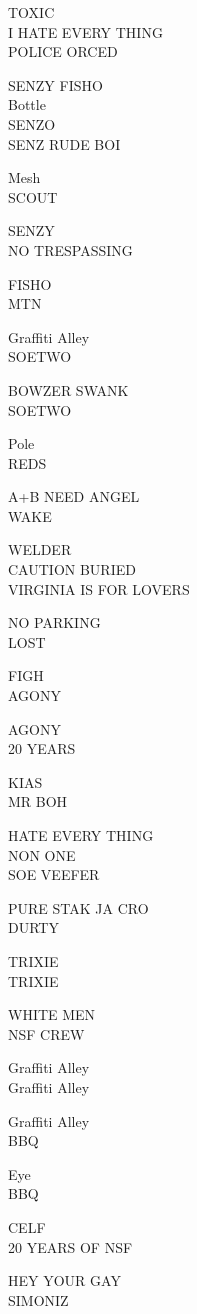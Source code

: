 \documentclass[10pt,letterpaper]{article}
\begin{document}
TOXIC\\
I HATE EVERY THING\\
POLICE ORCED

SENZY FISHO\\
Bottle\\
SENZO\\
SENZ RUDE BOI

Mesh\\
SCOUT

SENZY\\
NO TRESPASSING

FISHO\\
MTN

Graffiti Alley\\
SOETWO

BOWZER SWANK\\
SOETWO

Pole\\
REDS

A+B NEED ANGEL\\
WAKE

WELDER\\
CAUTION BURIED\\
VIRGINIA IS FOR LOVERS

NO PARKING\\
LOST

FIGH\\
AGONY

AGONY\\
20 YEARS

KIAS\\
MR BOH

HATE EVERY THING\\
NON ONE\\
SOE VEEFER

PURE STAK JA CRO\\
DURTY

TRIXIE\\
TRIXIE

WHITE MEN\\
NSF CREW

Graffiti Alley\\
Graffiti Alley

Graffiti Alley\\
BBQ

Eye\\
BBQ

CELF\\
20 YEARS OF NSF

HEY YOUR GAY\\
SIMONIZ
\end{document}

